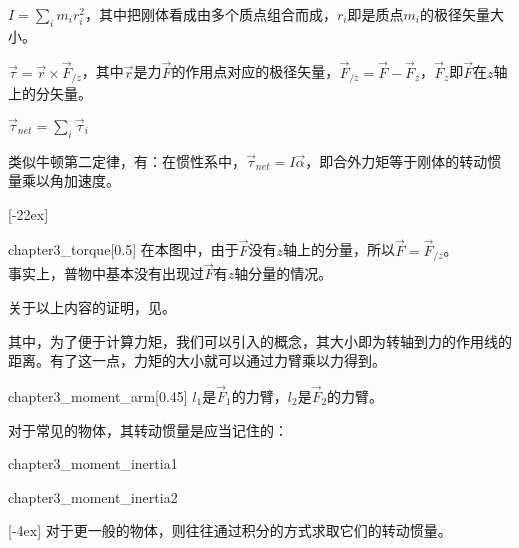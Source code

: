 \begin{Itemize}
	\item {} $\displaystyle I=\sum_{i}m_ir_i^2$，其中把刚体看成由多个质点组合而成，$r_i$即是质点$m_i$的极径矢量大小。
	
	\item {} $\vec{\tau}=\vec{r}\times\vec{F}_{/z}$，其中$\vec{r}$是力$\vec{F}$的作用点对应的极径矢量，$\vec{F}_{/z}=\vec{F}-\vec{F}_z$，$\vec{F}_z$即$\vec{F}$在$z$轴上的分矢量\footnotemark。
	\item {} $\displaystyle\vec{\tau}_{net}=\sum_{i}\vec{\tau}_i$
	\item 类似牛顿第二定律，有：在惯性系中，$\vec{\tau}_{net}=I\vec{\alpha}$，即合外力矩等于刚体的转动惯量乘以角加速度。
\end{Itemize}
[-22ex]
\clearpage
\begin{singlefigure}[力矩示意图]{chapter3_torque}[0.5]
	在本图中，由于$\vec{F}$没有$z$轴上的分量，所以$\vec{F}=\vec{F}_{/z}$。\\
	事实上，普物中基本没有出现过$\vec{F}$有$z$轴分量的情况。
\end{singlefigure}
关于以上内容的证明，见。

其中，为了便于计算力矩，我们可以引入的概念，其大小即为转轴到力的作用线的距离。有了这一点，力矩的大小就可以通过力臂乘以力得到。
\begin{singlefigure}[力臂示意图]{chapter3_moment_arm}[0.45]
	$l_1$是$\vec{F}_1$的力臂，$l_2$是$\vec{F}_2$的力臂。
\end{singlefigure}

对于常见的物体，其转动惯量是应当记住的：
\begin{singlefigure}{chapter3_moment_inertia1}
\end{singlefigure}
\vspace*{-2ex}
\begin{singlefigure}[常见物体的转动惯量]{chapter3_moment_inertia2}
\end{singlefigure}
[-4ex]
对于更一般的物体，则往往通过积分的方式求取它们的转动惯量。
